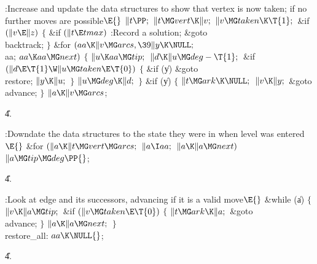 \B{}:Increase  and update the data structures to show
that vertex  is now taken;  if no further
moves are possible\X${}\E{}$\6
$\|t\PP;{}$\6
${}\|t\MG\\{vert}\K\|v;{}$\6
${}\|v\MG\\{taken}\K\T{1};{}$\6
\&{if} ${}(\|v\E\|z){}$\5
${}\{{}$\1\6
\&{if} ${}(\|t\E\\{tmax}){}$\1\5
:Record a solution\X;\2\6
\&{goto} \\{backtrack};\6
\4${}\}{}$\2\6
\&{for} ${}(\\{aa}\K\|v\MG\\{arcs},\39\|y\K\NULL;{}$ \\{aa}; ${}\\{aa}\K\\{aa}%
\MG\\{next}){}$\5
${}\{{}$\1\6
${}\|u\K\\{aa}\MG\\{tip};{}$\6
${}\|d\K\|u\MG\\{deg}-\T{1};{}$\6
\&{if} ${}(\|d\E\T{1}\W\|u\MG\\{taken}\E\T{0}){}$\5
${}\{{}$\1\6
\&{if} (\|y)\1\5
\&{goto} \\{restore};\2\6
${}\|y\K\|u;{}$\6
\4${}\}{}$\2\6
${}\|u\MG\\{deg}\K\|d;{}$\6
\4${}\}{}$\2\6
\&{if} (\|y)\5
${}\{{}$\1\6
${}\|t\MG\\{ark}\K\NULL;{}$\6
${}\|v\K\|y;{}$\6
\&{goto} \\{advance};\6
\4${}\}{}$\2\6
${}\|a\K\|v\MG\\{arcs}{}$;\par
\U4.\fi

\B{}:Downdate the data structures to the state they were in
when level  was entered\X${}\E{}$\6
\&{for} ${}(\|a\K\|t\MG\\{vert}\MG\\{arcs};{}$ ${}\|a\I\\{aa};{}$ ${}\|a\K\|a%
\MG\\{next}){}$\1\5
${}\|a\MG\\{tip}\MG\\{deg}\PP{}$;\2\par
\U4.\fi

\B{}:Look at edge  and its successors, advancing if it
is a valid move\X${}\E{}$\6
\&{while} (\|a)\5
${}\{{}$\1\6
${}\|v\K\|a\MG\\{tip};{}$\6
\&{if} ${}(\|v\MG\\{taken}\E\T{0}){}$\5
${}\{{}$\1\6
${}\|t\MG\\{ark}\K\|a;{}$\6
\&{goto} \\{advance};\6
\4${}\}{}$\2\6
${}\|a\K\|a\MG\\{next};{}$\6
\4${}\}{}$\2\6
\4\\{restore\_all}:\5
${}\\{aa}\K\NULL{}$;%
\par
\U4.\fi

